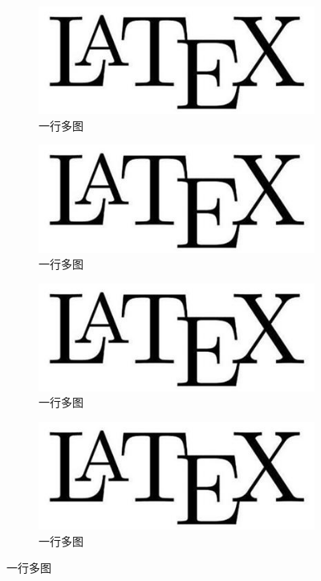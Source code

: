 \begin{figure}[htbp]
    \centering
    \begin{subfigure}[t]{0.2\linewidth}
        \includegraphics[width=\linewidth]{figure/Latex.jpg}
        \caption{一行多图}
        \label{fig:myfig2}
    \end{subfigure}
    \quad
    \begin{subfigure}[t]{0.2\linewidth}
        \includegraphics[width=\linewidth]{figure/Latex.jpg}
        \caption{一行多图}
        \label{fig:myfig3}
    \end{subfigure}
    \quad
    \begin{subfigure}[t]{0.2\linewidth}
        \includegraphics[width=\linewidth]{figure/Latex.jpg}
        \caption{一行多图}
        \label{fig:myfig4}
    \end{subfigure}
    \quad
    \begin{subfigure}[t]{0.2\linewidth}
        \includegraphics[width=\linewidth]{figure/Latex.jpg}
        \caption{一行多图}
        \label{fig:myfig5}
    \end{subfigure}
    \caption{一行多图}
    \label{fig:myfig6}
\end{figure}

